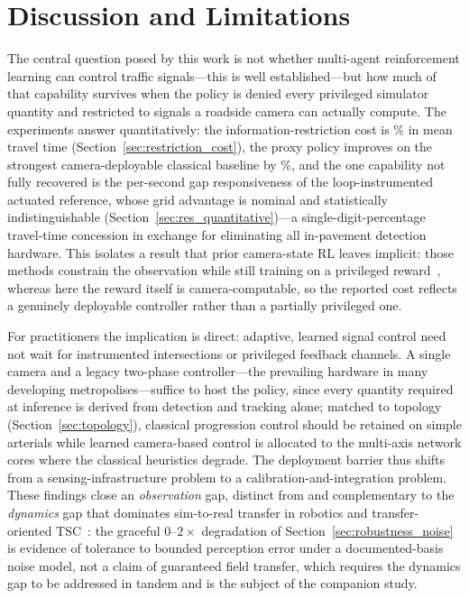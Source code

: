 \section{Discussion and Limitations}
\label{sec:discussion}

The central question posed by this work is not whether multi-agent reinforcement learning
can control traffic signals---this is well established---but how much of that capability
survives when the policy is denied every privileged simulator quantity and restricted to
signals a roadside camera can actually compute. The experiments answer quantitatively: the
information-restriction cost is \RestrictionCost\% in mean travel time
(Section~\ref{sec:restriction_cost}), the proxy policy improves on the strongest
camera-deployable classical baseline by \ImproveStrongest\%, and the one capability not
fully recovered is the per-second gap responsiveness of the loop-instrumented actuated
reference, whose grid advantage is nominal and statistically indistinguishable
(Section~\ref{sec:res_quantitative})---a single-digit-percentage travel-time concession in
exchange for eliminating all in-pavement detection hardware. This isolates a result that
prior camera-state RL leaves implicit: those methods constrain the observation while still
training on a privileged reward~\cite{azfar2025_cosim,dai2022_worldmodels}, whereas here
the reward itself is camera-computable, so the reported cost reflects a genuinely
deployable controller rather than a partially privileged one.

For practitioners the implication is direct: adaptive, learned signal control need not
wait for instrumented intersections or privileged feedback channels. A single camera and a
legacy two-phase controller---the prevailing hardware in many developing
metropolises---suffice to host the policy, since every quantity required at inference is
derived from detection and tracking alone; matched to topology
(Section~\ref{sec:topology}), classical progression control should be retained on simple
arterials while learned camera-based control is allocated to the multi-axis network cores
where the classical heuristics degrade. The deployment barrier thus shifts from a
sensing-infrastructure problem to a calibration-and-integration problem. These findings
close an \emph{observation} gap, distinct from and complementary to the \emph{dynamics}
gap that dominates sim-to-real transfer in robotics and transfer-oriented
TSC~\cite{peng2018_dynrand,zhao2020_sim2real_survey,da2024_promptgat}: the graceful
$0$--$2\times$ degradation of Section~\ref{sec:robustness_noise} is evidence of tolerance
to bounded perception error under a documented-basis noise model, not a claim of
guaranteed field transfer, which requires the dynamics gap to be addressed in tandem and
is the subject of the companion study.

